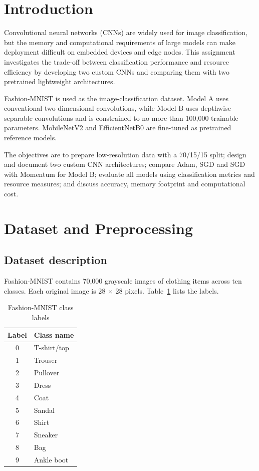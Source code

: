 \documentclass[12pt,a4paper]{article}
\begin{document}
\newpage
{}

\section{Introduction}
Convolutional neural networks (CNNs) are widely used for image classification, but the memory and computational requirements of large models can make deployment difficult on embedded devices and edge nodes. This assignment investigates the trade-off between classification performance and resource efficiency by developing two custom CNNs and comparing them with two pretrained lightweight architectures.

Fashion-MNIST is used as the image-classification dataset. Model A uses conventional two-dimensional convolutions, while Model B uses depthwise separable convolutions and is constrained to no more than 100,000 trainable parameters. MobileNetV2 and EfficientNetB0 are fine-tuned as pretrained reference models.

The objectives are to prepare low-resolution data with a 70/15/15 split; design and document two custom CNN architectures; compare Adam, SGD and SGD with Momentum for Model B; evaluate all models using classification metrics and resource measures; and discuss accuracy, memory footprint and computational cost.

\section{Dataset and Preprocessing}
\subsection{Dataset description}
Fashion-MNIST contains 70,000 grayscale images of clothing items across ten classes. Each original image is 28 $\times$ 28 pixels. Table~\ref{tab:classes} lists the labels.
\begin{table}[H]\centering
\caption{Fashion-MNIST class labels}\label{tab:classes}
\begin{tabular}{cl}\toprule Label & Class name\\\midrule
0 & T-shirt/top\\1 & Trouser\\2 & Pullover\\3 & Dress\\4 & Coat\\5 & Sandal\\6 & Shirt\\7 & Sneaker\\8 & Bag\\9 & Ankle boot\\\bottomrule
\end{tabular}\end{table}
\end{document}
